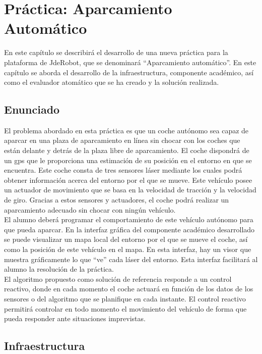 \chapter{Práctica: Aparcamiento Automático}\label{cap.autoparking}
En este capítulo se describirá el desarrollo de una nueva práctica para la plataforma de JdeRobot, que se denominará ``Aparcamiento automático''. En este capítulo se aborda el desarrollo de la infraestructura, componente académico, así como el evaluador atomático que se ha creado y la solución realizada.  

\section{Enunciado}
El problema abordado en esta práctica es que un coche autónomo sea capaz de aparcar en una plaza de aparcamiento en línea sin chocar con los coches que están delante y detrás de la plaza libre de aparcamiento. El coche dispondrá de un \acrshort{gps} que le proporciona una estimación de su posición en el entorno en que se encuentra. Este coche consta de tres sensores láser mediante los cuales podrá obtener información acerca del entorno por el que se mueve. Este vehículo posee un actuador de movimiento que se basa en la velocidad de tracción y la velocidad de giro. Gracias a estos sensores y actuadores, el coche podrá realizar un aparcamiento adecuado sin chocar con ningún vehículo.\\

El alumno deberá programar el comportamiento de este vehículo autónomo para que pueda aparcar. En la interfaz gráfica del componente académico desarrollado se puede visualizar un mapa local del entorno por el que se mueve el coche, así como la posición de este vehículo en el mapa. En esta interfaz, hay un visor que muestra gráficamente lo que ``ve'' cada láser del entorno. Esta interfaz facilitará al alumno la resolución de la práctica.\\

El algoritmo propuesto como solución de referencia responde a un control reactivo, donde en cada momento el coche actuará en función de los datos de los sensores o del algoritmo que se planifique en cada instante. El control reactivo permitirá controlar en todo momento el movimiento del vehículo de forma que pueda responder ante situaciones imprevistas.

\section{Infraestructura}

